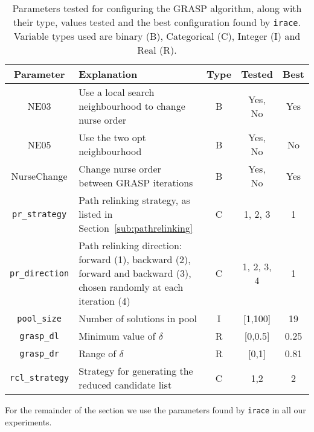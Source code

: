 \documentclass[a4paper,11pt,authoryear]{elsarticle}
\begin{document}
\begin{table}[h]
    \centering
    \caption{Parameters tested for configuring the GRASP algorithm, along with their type, values tested and the best configuration found by \texttt{irace}. Variable types used are binary (B), Categorical (C), Integer (I) and Real (R).}
    \begin{tabular}{cp{5.5cm}ccc}
    \toprule
    \textbf{Parameter}& \textbf{Explanation}  & \textbf{Type} & \textbf{Tested} & \textbf{Best} \\
    \midrule
    NE03 & Use a local search neighbourhood to change nurse order & B & Yes, No & Yes \\ %
    NE05 & Use the two opt neighbourhood & B & Yes, No & No \\ %
    NurseChange & Change nurse order between GRASP iterations & B & Yes, No & Yes \\ %
    \texttt{pr\_strategy} & Path relinking strategy, as listed in Section~\ref{sub:pathrelinking} & C & 1, 2, 3 & 1 \\ %
    \texttt{pr\_direction} & Path relinking direction: forward (1), backward (2), forward and backward (3), chosen randomly at each iteration (4) & C & 1, 2, 3, 4 & 1 \\ %
    \texttt{pool\_size} & Number of solutions in pool & I & [1,100] & 19 \\ %
    \texttt{grasp\_dl} & Minimum value of $\delta$ & R & [0,0.5] & 0.25 \\ %
    \texttt{grasp\_dr} & Range of $\delta$ & R & [0,1] & 0.81 \\ %
    \texttt{rcl\_strategy} & Strategy for generating the reduced candidate list & C & 1,2 & 2 \\ %
    \bottomrule
    \end{tabular}
    \label{table:parameters}
\end{table}

For the remainder of the section we use the parameters found by \texttt{irace} in all our experiments.

\end{document}
